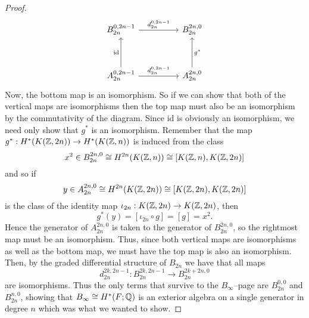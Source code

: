 \documentclass[../main.tex]{subfiles}
\begin{document}
\begin{proof}
\begin{equation}
\begin{tikzcd}
            {B_{2n}^{0, 2n-1}} && {B^{2n,0}_{2n}} \\
            \\
            {A^{0, 2n-1}_{2n}} && {A^{2n,0}_{2n}}
            \arrow["{d_{2n}^{0, 2n-1}}", from=1-1, to=1-3]
            \arrow["{d_{2n}^{0, 2n-1}}", from=3-1, to=3-3]
            \arrow["{\text{id}}", from=3-1, to=1-1]
            \arrow["{g^*}"', from=3-3, to=1-3]
        \end{tikzcd}
    \end{equation}
    Now, the bottom map is an isomorphism. So if we can show that
    both of the vertical maps are isomorphisms then the top map must
    also be an isomorphism by the commutativity of the diagram. Since
    \( \text{id} \) is obviously an isomorphism, we need only show that
    \( g^* \) is an isomorphism. Remember
    that the map \( g^*:H^*(K(\mathbb{Z}, 2n))\rightarrow H^*(K(\mathbb{Z}, n)) \) is induced
    from the class \[ x^2\in B^{2n, 0}_{2n}\cong H^{2n}(K(\mathbb{Z},n))\cong[K(\mathbb{Z}, n), K(\mathbb{Z}, 2n)] \] and
    so if \[ y\in A^{2n, 0}_{2n}\cong H^{2n}(K(\mathbb{Z}, 2n))\cong [K(\mathbb{Z}, 2n),
    K(\mathbb{Z}, 2n)] \] is the class of the identity map \( \iota_{2n}:K(\mathbb{Z}, 2n)\rightarrow K(\mathbb{Z}, 2n) \), then
    \begin{equation}
        g^*(y)=[\iota_{2n}\circ g] = [g]=x^2.
    \end{equation}
    Hence the generator of \( A^{2n, 0}_{2n} \) is taken to the generator
    of \( B^{2n, 0}_{2n} \), so the rightmost map must be an
    isomorphism. 
    Thus, since both vertical maps are isomorphisms as well
    as the bottom map, we must have the top map is also an
    isomorphism. Then, by the graded differential structure of
    \( B_{2n} \) we have that all maps \[ d^{2k, 2n-1}_{2n}:B_{2n}^{2k,2n-1}\rightarrow B_{2n}^{2k+2n, 0} \] are
    isomorphisms. Thus the only terms that survive to the
    \( B_\infty \)--page are \( B_{2n}^{0, 0} \) 
    and \( B_{2n}^{n, 0} \), showing that
    \( B_\infty\cong H^*(F;\mathbb{Q}) \) is an exterior algebra on a single
    generator in degree \( n \) which was what we wanted to show.
\end{proof}
\end{document}
